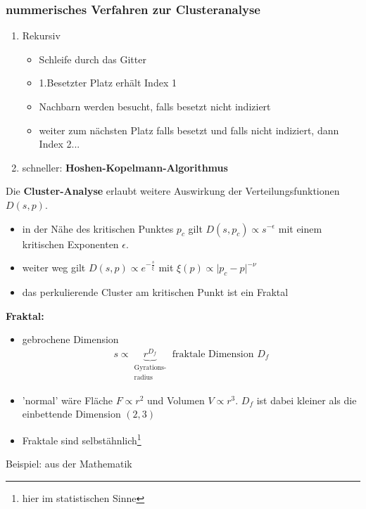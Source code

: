 \documentclass[12pt]{article}
\begin{document}
 	\subsubsection{nummerisches Verfahren zur Clusteranalyse}
 		\begin{enumerate}
 		
 		\item Rekursiv %
 			\begin{itemize}
 			\item Schleife durch das Gitter
 			\item 1.Besetzter Platz erhält Index 1
 			\item Nachbarn werden besucht, falls besetzt nicht indiziert
 			\item weiter zum nächsten Platz falls besetzt und falls nicht indiziert, dann Index 2...
 			\end{itemize}
 			
 		\item schneller: \textbf{Hoshen-Kopelmann-Algorithmus}
 		
\end{enumerate} 	

Die \textbf{Cluster-Analyse} erlaubt weitere Auswirkung der Verteilungsfunktionen $D(s,p)$.
\begin{itemize}
\item in der Nähe des kritischen Punktes $p_c$ gilt $D(s,p_c) \propto s^{-\epsilon}$ mit einem kritischen Exponenten $\epsilon$.
\item weiter weg gilt $D(s,p) \propto e^{-\frac{s}{\xi}}$ mit $\xi (p) \propto \vert p_c - p \vert ^{- \nu}$
\item das perkulierende Cluster am kritischen Punkt ist ein Fraktal
\end{itemize}	 
\textbf{Fraktal:} 
\begin{itemize}
	\item gebrochene Dimension \begin{align}
	s \propto \underbrace{r^{D_f}}_{\substack{\text{Gyrations-} \\ \text{radius}}} \mbox{ fraktale Dimension } D_f
\end{align}	 
\item 'normal' wäre Fläche $F \propto r^2$ und Volumen $V \propto r^3$. $D_f$ ist dabei kleiner als die einbettende Dimension $(2,3)$
\item Fraktale sind selbstähnlich\footnote{hier im statistischen Sinne}
\end{itemize}
Beispiel: aus der Mathematik %
\end{document}
